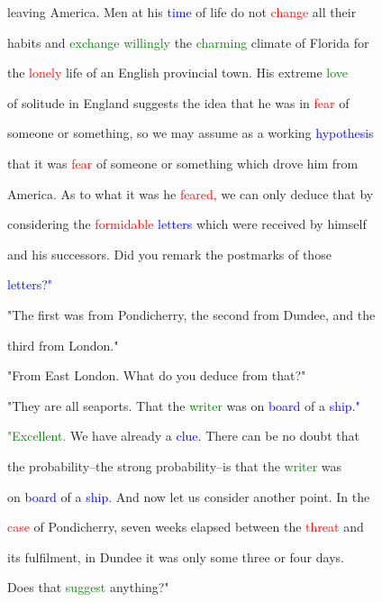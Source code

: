 \textcolor{BurntOrange}{leaving} America. Men at his \textcolor{blue}{time} of life do not \textcolor{red}{change} all their

 habits and \textcolor{green}{exchange} \textcolor{green}{willingly} the \textcolor{green}{charming} climate of Florida for

 the \textcolor{red}{lonely} life of an English provincial town. His extreme \textcolor{green}{love}

 of solitude in England suggests the idea that he was in \textcolor{red}{fear} of

 someone or something, so we may assume as a working \textcolor{blue}{hypothesis}

 that it was \textcolor{red}{fear} of someone or something which drove him from

 America. As to what it was he \textcolor{red}{feared,} we can only deduce that by

 considering the \textcolor{red}{formidable} \textcolor{blue}{letters} which were received by himself

 and his successors. Did you remark the postmarks of those

 \textcolor{blue}{letters?"}



 "The first was from Pondicherry, the second from Dundee, and the

 third from London."



 "From East London. What do you deduce from that?"



 "They are all seaports. That the \textcolor{green}{writer} was on \textcolor{blue}{board} of a \textcolor{blue}{ship."}



 \textcolor{green}{"Excellent.} We have already a \textcolor{blue}{clue.} There can be no \textcolor{BurntOrange}{doubt} that

 the probability--the strong probability--is that the \textcolor{green}{writer} was

 on \textcolor{blue}{board} of a \textcolor{blue}{ship.} And now let us consider another point. In the

 \textcolor{red}{case} of Pondicherry, seven weeks elapsed between the \textcolor{red}{threat} and

 its fulfilment, in Dundee it was only some three or four days.

 Does that \textcolor{green}{suggest} anything?"



